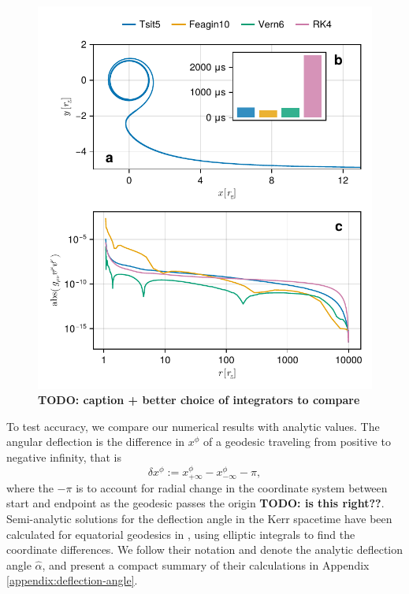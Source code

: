 \documentclass[fleqn,usenatbib]{mnras}
\newcommand{\todo}[1]{{\noindent \bf \color{red} TODO: #1}}
\begin{document}
\begin{figure}
	\centering
	\includegraphics[width=0.95\linewidth]{figures/stability.conservation.pdf}
	\caption{\todo{caption + better choice of integrators to compare}}
	\label{fig:dot-stability}
\end{figure}

To test accuracy, we compare our numerical results with analytic values. The angular deflection is the difference in $x^\phi$ of a geodesic traveling from positive to negative infinity, that is
\begin{equation}
	\delta x^\phi :=
		x^\phi_{+\infty} - x^\phi_{-\infty}
		- \pi,
\end{equation}
where the $-\pi$ is to account for radial change in the coordinate system between start and endpoint as the geodesic passes the origin \todo{is this right??}. Semi-analytic solutions for the deflection angle in the Kerr spacetime have been calculated for equatorial geodesics in \cite{iyer_lights_2009}, using elliptic integrals to find the coordinate differences. We follow their notation and denote the analytic deflection angle $\hat{\alpha}$, and present a compact summary of their calculations in Appendix \ref{appendix:deflection-angle}.
\end{document}
